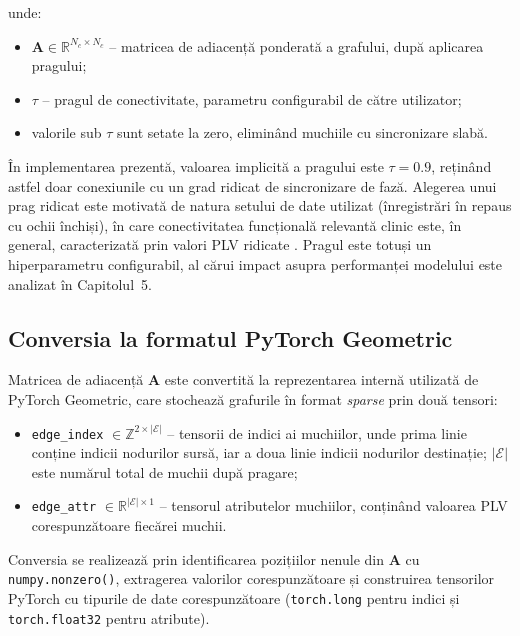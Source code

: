 \documentclass[12pt,a4paper]{report}
\theoremstyle{definition}
\theoremstyle{remark}
\begin{document}
\noindent unde:
\begin{itemize}
    \item $\mathbf{A} \in \mathbb{R}^{N_c \times N_c}$ -- matricea de adiacență ponderată a grafului, după aplicarea pragului;
    \item $\tau$ -- pragul de conectivitate, parametru configurabil de către utilizator;
    \item valorile sub $\tau$ sunt setate la zero, eliminând muchiile cu sincronizare slabă.
\end{itemize}

În implementarea prezentă, valoarea implicită a pragului este $\tau = 0.9$, reținând astfel doar conexiunile cu un grad ridicat de sincronizare de fază. Alegerea unui prag ridicat este motivată de natura setului de date utilizat (înregistrări în repaus cu ochii închiși), în care conectivitatea funcțională relevantă clinic este, în general, caracterizată prin valori PLV ridicate \cite{klepl2023gnn}. Pragul este totuși un hiperparametru configurabil, al cărui impact asupra performanței modelului este analizat în Capitolul~5.

\subsection{Conversia la formatul PyTorch Geometric}

Matricea de adiacență $\mathbf{A}$ este convertită la reprezentarea internă utilizată de PyTorch Geometric, care stochează grafurile în format \textit{sparse} prin două tensori:

\begin{itemize}
    \item \texttt{edge\_index} $\in \mathbb{Z}^{2 \times |\mathcal{E}|}$ -- tensorii de indici ai muchiilor, unde prima linie conține indicii nodurilor sursă, iar a doua linie indicii nodurilor destinație; $|\mathcal{E}|$ este numărul total de muchii după pragare;
    \item \texttt{edge\_attr} $\in \mathbb{R}^{|\mathcal{E}| \times 1}$ -- tensorul atributelor muchiilor, conținând valoarea PLV corespunzătoare fiecărei muchii.
\end{itemize}

Conversia se realizează prin identificarea pozițiilor nenule din $\mathbf{A}$ cu \texttt{numpy.nonzero()}, extragerea valorilor corespunzătoare și construirea tensorilor PyTorch cu tipurile de date corespunzătoare (\texttt{torch.long} pentru indici și \texttt{torch.float32} pentru atribute).
\end{document}
